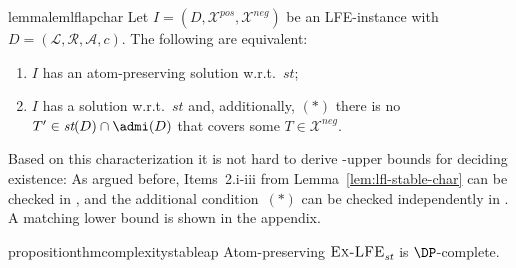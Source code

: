 \documentclass[letterpaper]{article} %
\newcommand{\stb}{\textit{st}}
\newcommand{\asms}{\asm}
\newcommand{\asm}{\ensuremath{\mathcal{A}}}
\newcommand{\atoms}{\mathcal{L}}
\newcommand{\ruleset}{\mathcal{R}}
\newcommand{\assumptions}{\mathcal{A}}
\newcommand{\contra}{c}
\newcommand{\ABAdef}{D=(\atoms,\ruleset,\assumptions,\contra)}
\newcommand{\setS}{\mathbb{S}}
\newcommand{\contraryArgs}[1]{\asm^{c}_{#1}}
\newcommand{\ExLFE}[2]{\textsc{Ex-LFE}_{#1}^{#2}}
\newcommand{\Xpos}{\mathcal{X}^{pos}}
\newcommand{\Xneg}{\mathcal{X}^{neg}}
\begin{document}
%
\begin{restatable}{lemma}{lemlflapchar}
\label{lem:lfl-stable-ap-char}
Let $I=(D,\Xpos,\Xneg)$ be an LFE-instance with $\ABAdef$. The following are equivalent:
\begin{enumerate}
    \item $I$ has an atom-preserving solution w.r.t.~$\stb$; 
    \item $I$ has a solution
w.r.t.~$\stb$ and, additionally, $(\ast)$
    there is no $T'\in \stb(D)\cap \admi(D)$ that covers some $T\in \Xneg$.
%
% 
% 
%
\end{enumerate}
\end{restatable}
Based on this characterization it is not hard to derive \DP-upper bounds for deciding existence: As argued before, Items~2.i-iii from Lemma~\ref{lem:lfl-stable-char} can be checked in \NP, and the additional condition~$(\ast)$ can be checked independently in \coNP. A matching lower bound is shown in the appendix.  

\begin{restatable}{proposition}{thmcomplexitystableap}\label{thm:complexity-stable-LFE-atom-pres} Atom-preserving
$\ExLFE{\stb}{}$ is $\DP$-complete.
\end{restatable}




\end{document}
